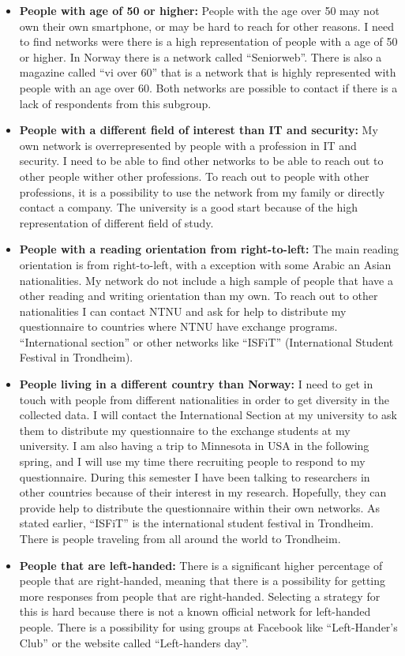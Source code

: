       \begin{itemize}
        \item {\bf People with age of 50 or higher:} People with the age over 50 may not own their own smartphone, or may be hard to reach for other reasons. I need to find networks were there is a high representation of people with a age of 50 or higher. In Norway there is a network called ``Seniorweb''. There is also a magazine called ``vi over 60'' that is a network that is highly represented with people with an age over 60. Both networks are possible to contact if there is a lack of respondents from this subgroup. 
        \item {\bf People with a different field of interest than IT and security:} My own network is overrepresented by people with a profession in IT and security. I need to be able to find other networks to be able to reach out to other people wither other professions. To reach out to people with other professions, it is a possibility to use the network from my family or directly contact a company. The university is a good start because of the high representation of different field of study. 
        \item {\bf People with a reading orientation from right-to-left:} The main reading orientation is from right-to-left, with a exception with some Arabic an Asian nationalities. My network do not include a high sample of people that have a other reading and writing orientation than my own. To reach out to other nationalities I can contact NTNU and ask for help to distribute my questionnaire to countries where NTNU have exchange programs. ``International section'' or other networks like ``ISFiT'' (International Student Festival in Trondheim). 
        \item {\bf People living in a different country than Norway:} I need to get in touch with people from different nationalities in order to get diversity in the collected data. I will contact the International Section at my university to ask them to distribute my questionnaire to the exchange students at my university. I am also having a trip to Minnesota in USA in the following spring, and I will use my time there recruiting people to respond to my questionnaire. During this semester I have been talking to researchers in other countries because of their interest in my research. Hopefully, they can provide help to distribute the questionnaire within their own networks. As stated earlier, ``ISFiT'' is the international student festival in Trondheim. There is people traveling from all around the world to Trondheim. 
        \item {\bf People that are left-handed:} There is a significant higher percentage of people that are right-handed, meaning that there is a possibility for getting more responses from people that are right-handed. Selecting a strategy for this is hard because there is not a known official network for left-handed people. There is a possibility for using groups at Facebook like ``Left-Hander's Club'' or the website called ``Left-handers day''. 
      \end{itemize}

